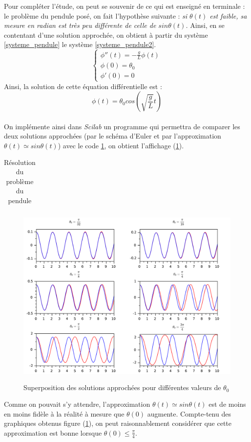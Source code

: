 \documentclass[a4paper,10pt]{report}
\begin{document}
Pour compléter l'étude, on peut se souvenir de ce qui est enseigné en terminale : le problème du pendule posé, on fait l'hypothèse suivante : \textit{si $\theta(t)$ est faible, sa mesure en radian est très peu différente de celle de $sin\theta(t)$.} Ainsi, en se contentant d'une solution approchée, on obtient à partir du système \ref{systeme_pendule} le système \ref{systeme_pendule2}.
\begin{equation}
\label{systeme_pendule2}
\left\lbrace
\begin{array}{l}
\phi''(t)= -\frac{g}{L}\phi (t)  \\
\phi(0)=\theta_0 \\
\phi'(0)=0
\end{array}\right.
\end{equation}
\indent Ainsi, la solution de cette équation différentielle est :
\begin{equation}
\phi(t)=\theta_0 cos \left( \sqrt{\frac{g}{L}}t \right)
\end{equation}\\

On implémente ainsi dans \textit{Scilab} un programme qui permettra de comparer les deux solutions approchées (par le schéma d'Euler et par l'approximation $\theta(t)\simeq sin\theta(t)$) avec le code \ref{code_pendule}, on obtient l'affichage (\ref{aff_pendule}).
\begin{table}[H]
\caption{Résolution du problème du pendule}
\begin{tabular}{l}

\label{code_pendule}
\end{tabular}
\end{table}

\begin{figure}[H]
\centering
\caption{Superposition des solutions approchées pour différentes valeurs de $\theta_0$}
\includegraphics[width=\textwidth]{graph_pendule.pdf}
\label{aff_pendule}
\end{figure}
Comme on pouvait s'y attendre, l'approximation $\theta(t)\simeq sin\theta(t)$ est de moins en moins fidèle à la réalité à mesure que $\theta(0)$ augmente. Compte-tenu des graphiques obtenus figure (\ref{aff_pendule}), on peut raisonnablement considérer que cette approximation est bonne lorsque $\theta(0) \leq \frac{\pi}{4}$.
\end{document}
